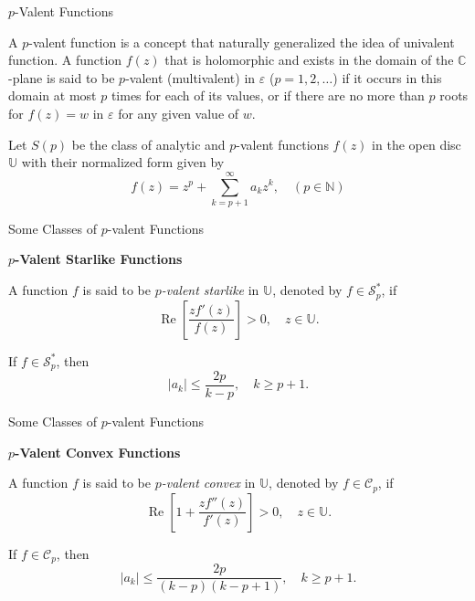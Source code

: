 \documentclass{beamer}
\newcommand{\N}{\mathbb{N}}
\newcommand{\C}{\mathbb{C}}
\newcommand{\U}{\mathbb{U}}
\DeclareMathOperator{\re}{Re}
\begin{document}
	\begin{frame}{$p$-Valent Functions}
		
		\begin{definition}
			A $p$-valent function is a concept that naturally generalized the idea of univalent function. A function $f(z)$ that is holomorphic and exists in the domain of the $\C$-plane is said to be $p$-valent (multivalent) in $\varepsilon$ ($p = 1, 2, \dots$) if it occurs in this domain at most $p$ times for each of its values, or if there are no more than $p$ roots for $f(z) = w$ in $\varepsilon$ for any given value of $w$.
		\end{definition}
		
		\begin{definition}
			Let $S(p)$ be the class of analytic and $p$-valent functions $f(z)$ in the open disc $\U$ with their normalized form given by
			\[
			f(z) = z^p + \sum_{k=p+1}^{\infty} a_k z^k, \quad (p \in \N)
			\]
		\end{definition}
	\end{frame}
	
	\begin{frame}{Some Classes of $p$-valent Functions}
		
		\textbf{$p$-Valent Starlike Functions}\\
		
		\begin{definition}
			A function $f$ is said to be \emph{$p$-valent starlike} in $\U$, denoted by $f \in \mathcal{S}_p^*$, if
			\[
			\re\left[\frac{z f'(z)}{f(z)}\right] > 0,
			\quad z \in \U.
			\]
		\end{definition}
		
		\begin{theorem}\label{thm:coeff-starlike}
			If $f \in \mathcal{S}_p^*$, then
			\[
			|a_k| \le \frac{2p}{k-p}, \quad k \ge p+1.
			\]
		\end{theorem}
	\end{frame}
	
	\begin{frame}{Some Classes of $p$-valent Functions}
		
		\textbf{$p$-Valent Convex Functions}
		
		\begin{definition}
			A function $f$ is said to be \emph{$p$-valent convex} in $\U$, denoted by $f \in \mathcal{C}_p$, if
			\[
			\re\left[1 + \frac{z f''(z)}{f'(z)}\right] > 0, \quad z \in \U.
			\]
		\end{definition}
		
		
		\begin{theorem}\label{thm:coeff-convex}
			If $f \in \mathcal{C}_p$, then
			\[
			|a_k| \le \frac{2p}{(k-p)(k-p+1)}, \quad k \ge p+1.
			\]
		\end{theorem}
	\end{frame}
	
\end{document}
